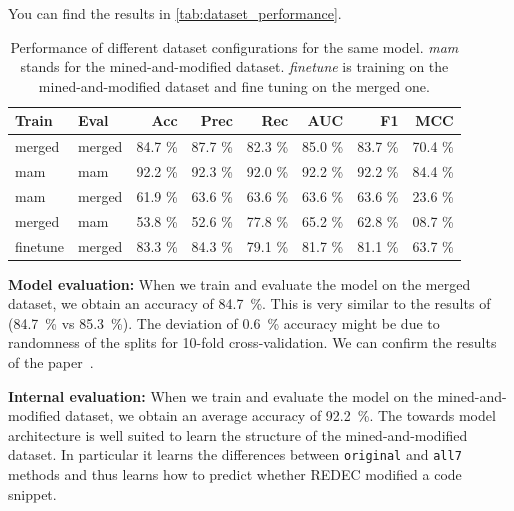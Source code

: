 \documentclass[%
class=scrreprt,
chapterprefix=false,%
open=right,%
twoside=false,%
paper=a4,%
logofile={Logo\_zentral\_farbig\_EN.png},%
thesistype=master,%
UKenglish,%
]{se2thesis}
\theoremstyle{definition}
\newcommand{\rdh}{REDEC\xspace}
\begin{document}
	You can find the results in \autoref{tab:dataset_performance}.
		
	\begin{table}[tb]
		\centering
		\caption{Performance of different dataset configurations for the same model. \textit{mam} stands for the mined-and-modified dataset. \textit{finetune} is training on the mined-and-modified dataset and fine tuning on the merged one.
		}
		\label{tab:dataset_performance}
		\begin{tabular}{llrrrrrr}
			\toprule
			Train & Eval & Acc & Prec & Rec & AUC & F1 & MCC \\
			\midrule
			merged      & merged   	& 84.7 \% & 87.7 \% & 82.3 \% & 85.0 \% & 83.7 \% & 70.4 \% \\
			mam        	& mam    	& 92.2 \% & 92.3 \% & 92.0 \% & 92.2 \% & 92.2 \% & 84.4 \% \\
			mam			& merged    & 61.9 \% & 63.6 \% & 63.6 \% & 63.6 \% & 63.6 \% & 23.6 \% \\
			merged      & mam	    & 53.8 \% & 52.6 \% & 77.8 \% & 65.2 \% & 62.8 \% & 08.7 \% \\
			finetune	& merged    & 83.3 \% & 84.3 \% & 79.1 \% & 81.7 \% & 81.1 \% & 63.7 \% \\
			\bottomrule
		\end{tabular}
	\end{table}
	
	\textbf{Model evaluation:}
	When we train and evaluate the model on the merged dataset, we obtain an accuracy of 84.7~\%. This is very similar to the results of \citeauthor{mi2022towards} (84.7~\% vs 85.3~\%). The deviation of 0.6~\% accuracy might be due to randomness of the splits for 10-fold cross-validation. We can confirm the results of the paper~\cite{mi2022towards}.
	
	\textbf{Internal evaluation:}
	When we train and evaluate the model on the mined-and-modified dataset, we obtain an average accuracy of 92.2~\%.
	The towards model architecture is well suited to learn the structure of the mined-and-modified dataset. In particular it learns the differences between \texttt{original} and \texttt{all7} methods and thus learns how to predict whether \rdh modified a code snippet. 
\end{document}
